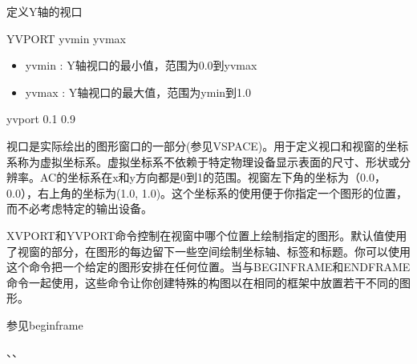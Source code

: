 \label{cmd:yvport}

定义Y轴的视口

\begin{SACSTX}
YVPORT yvmin yvmax
\end{SACSTX}

\begin{itemize}
\item yvmin : Y轴视口的最小值，范围为0.0到yvmax 
\item yvmax : Y轴视口的最大值，范围为ymin到1.0 
\end{itemize}

\begin{SACDFT}
yvport 0.1 0.9
\end{SACDFT}

视口是实际绘出的图形窗口的一部分(参见VSPACE)。用于定义视口和视窗的坐标系称为虚拟坐标系。虚拟坐标系不依赖于特定物理设备显示表面的尺寸、形状或分辨率。AC的坐标系在x和y方向都是0到1的范围。视窗左下角的坐标为（0.0，0.0），右上角的坐标为(1.0, 1.0)。这个坐标系的使用便于你指定一个图形的位置，而不必考虑特定的输出设备。

XVPORT和YVPORT命令控制在视窗中哪个位置上绘制指定的图形。默认值使用了视窗的部分，在图形的每边留下一些空间绘制坐标轴、标签和标题。你可以使用这个命令把一个给定的图形安排在任何位置。当与BEGINFRAME和ENDFRAME命令一起使用，这些命令让你创建特殊的构图以在相同的框架中放置若干不同的图形。

参见beginframe

、、
